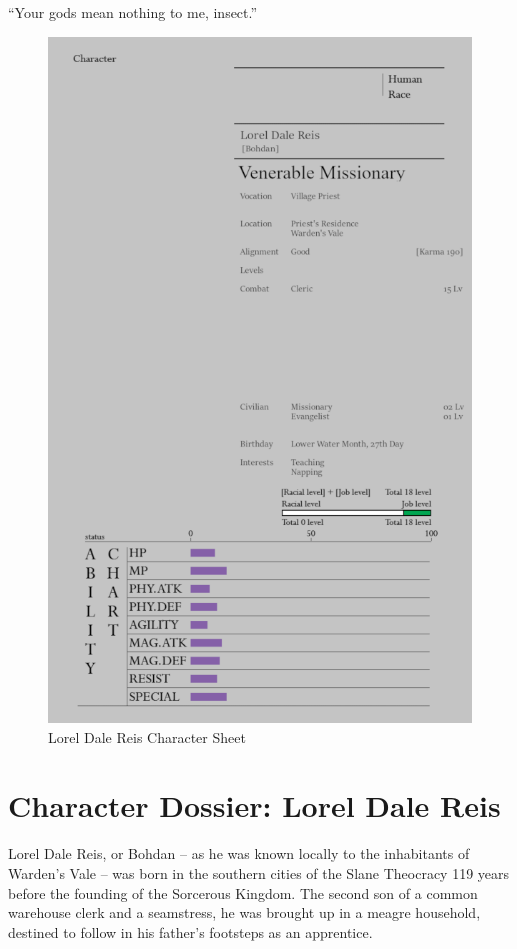  

“Your gods mean nothing to me, insect.”

\begin{figure}
    \centering
    \includegraphics[width=1\linewidth]{images/17LKe7u.png}
    \caption*{Lorel Dale Reis Character Sheet}
\end{figure}

\section*{Character Dossier: Lorel Dale Reis}

Lorel Dale Reis, or Bohdan – as he was known locally to the inhabitants of Warden’s Vale – was born in the southern cities of the Slane Theocracy 119 years before the founding of the Sorcerous Kingdom. The second son of a common warehouse clerk and a seamstress, he was brought up in a meagre household, destined to follow in his father’s footsteps as an apprentice.

